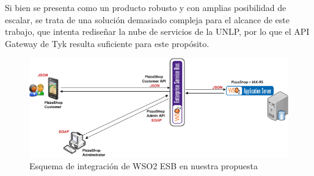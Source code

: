 Si bien se presenta como un producto robusto y con amplias posibilidad de escalar, se trata de una solución demasiado compleja para el alcance de este trabajo, que intenta rediseñar la nube de servicios de la UNLP, por lo que el API Gateway de Tyk resulta suficiente para este propósito.

\begin{figure}[H]
  \includegraphics[width=\linewidth]{src/images/03-capitulo-3/tecnologias/wso2/wso2_esb.png}
  \caption{Esquema de integración de WSO2 ESB en nuestra propuesta}
  \label{fig:integracion-wso2-esb-arquitectura}
\end{figure}
